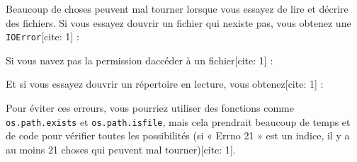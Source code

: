 Beaucoup de choses peuvent mal tourner lorsque vous essayez de lire et
d\textquotesingle écrire des fichiers. Si vous essayez
d\textquotesingle ouvrir un fichier qui n\textquotesingle existe pas,
vous obtenez une \texttt{IOError}{[}cite: 1{]} :

\begin{Shaded}
\begin{Highlighting}[]
\OperatorTok{\textgreater{}\textgreater{}\textgreater{}}\OperatorTok{=} \NormalTok{(}\NormalTok{)}
\NormalTok{: [Errno }\NormalTok{] No such } 
\end{Highlighting}
\end{Shaded}

Si vous n\textquotesingle avez pas la permission
d\textquotesingle accéder à un fichier{[}cite: 1{]} :

\begin{Shaded}
\begin{Highlighting}[]
\OperatorTok{\textgreater{}\textgreater{}\textgreater{}}\OperatorTok{=} \NormalTok{(}\NormalTok{, }\NormalTok{)}
\NormalTok{: [Errno }\NormalTok{] Permission denied: }
\end{Highlighting}
\end{Shaded}

Et si vous essayez d\textquotesingle ouvrir un répertoire en lecture,
vous obtenez{[}cite: 1{]} :

\begin{Shaded}
\begin{Highlighting}[]
\OperatorTok{\textgreater{}\textgreater{}\textgreater{}}\OperatorTok{=} \NormalTok{(}\NormalTok{)}
\NormalTok{: [Errno }\NormalTok{] Is a directory}
\end{Highlighting}
\end{Shaded}

Pour éviter ces erreurs, vous pourriez utiliser des fonctions comme
\texttt{os.path.exists} et \texttt{os.path.isfile}, mais cela prendrait
beaucoup de temps et de code pour vérifier toutes les possibilités (si «
Errno 21 » est un indice, il y a au moins 21 choses qui peuvent mal
tourner){[}cite: 1{]}.

